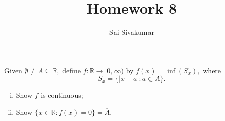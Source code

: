 \documentclass[12pt]{amsart}
\title{Homework 8}
\author{Sai Sivakumar}
\newcommand{\RR}{\mathbb{R}}
\begin{document}
\maketitle

Given $\emptyset \neq  A\subseteq \RR,$ define $f:\RR\to[0,\infty)$ by
 $f(x)=\inf(S_x),$ where
\[
S_x=\{|x-a|:a\in A\}.
\]
\begin{enumerate}[(i)]
 \item \label{i:7-i}  Show $f$ is continuous;
 \item Show $\{x\in \RR:f(x)=0\}=\overline{A}.$
\end{enumerate}

\end{document}
